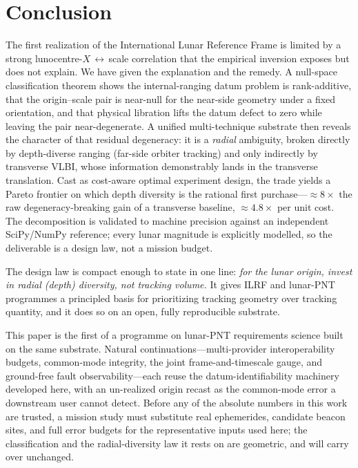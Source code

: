 \section{Conclusion}
\label{sec:conclusion}

The first realization of the International Lunar Reference Frame is limited by a
strong lunocentre-$X$\,$\leftrightarrow$\,scale correlation that the empirical
inversion exposes but does not explain. We have given the explanation and the
remedy. A null-space classification theorem shows the internal-ranging datum
problem is rank-additive, that the origin--scale pair is near-null for the
near-side geometry under a fixed orientation, and that physical libration lifts the
datum defect to zero while leaving the pair near-degenerate. A unified
multi-technique substrate then reveals the character of that residual degeneracy:
it is a \emph{radial} ambiguity, broken directly by depth-diverse ranging
(far-side orbiter tracking) and only indirectly by transverse VLBI, whose
information demonstrably lands in the transverse translation. Cast as cost-aware
optimal experiment design, the trade yields a Pareto frontier on which depth
diversity is the rational first purchase---$\approx\!8\times$ the raw
degeneracy-breaking gain of a transverse baseline, $\approx\!4.8\times$ per unit
cost. The decomposition is validated to machine precision against an independent
SciPy/NumPy reference; every lunar magnitude is explicitly modelled, so the
deliverable is a design law, not a mission budget.

The design law is compact enough to state in one line: \emph{for the lunar origin,
invest in radial (depth) diversity, not tracking volume.} It gives ILRF and
lunar-PNT programmes a principled basis for prioritizing tracking geometry over
tracking quantity, and it does so on an open, fully reproducible substrate.

This paper is the first of a programme on lunar-PNT requirements science built on
the same substrate. Natural continuations---multi-provider interoperability
budgets, common-mode integrity, the joint frame-and-timescale gauge, and
ground-free fault observability---each reuse the datum-identifiability machinery
developed here, with an un-realized origin recast as the common-mode error a
downstream user cannot detect. Before any of the absolute numbers in this work are
trusted, a mission study must substitute real ephemerides, candidate beacon sites,
and full error budgets for the representative inputs used here; the classification
and the radial-diversity law it rests on are geometric, and will carry over
unchanged.
